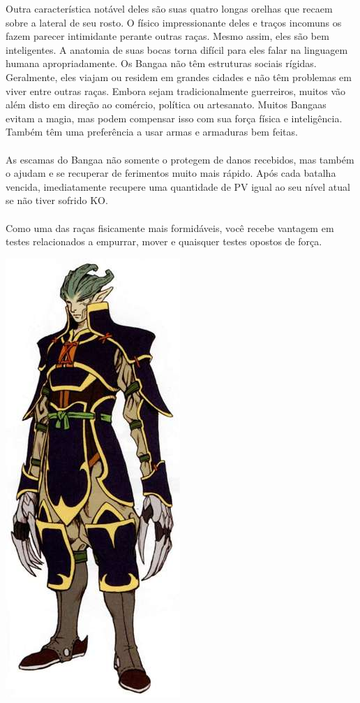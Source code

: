 Outra característica notável deles são suas quatro longas orelhas que recaem sobre a lateral de seu rosto.
O físico impressionante deles e traços incomuns os fazem parecer intimidante perante outras raças.
Mesmo assim, eles são bem inteligentes. A anatomia de suas bocas torna difícil para eles falar na linguagem humana apropriadamente.
Os Bangaa não têm estruturas sociais rígidas.
Geralmente, eles viajam ou residem em grandes cidades e não têm problemas em viver entre outras raças.
Embora sejam tradicionalmente guerreiros, muitos vão além disto em direção ao comércio, política ou artesanato.
Muitos Bangaas evitam a magia, mas podem compensar isso com sua força física e inteligência.
Também têm uma preferência a usar armas e armaduras bem feitas.
%
\\\\
%
 As escamas do Bangaa 
não somente o protegem de danos recebidos, mas também o ajudam e se recuperar de ferimentos muito mais rápido.
Após cada batalha vencida, imediatamente recupere uma quantidade de PV igual ao seu nível atual se não tiver sofrido KO.
%
\\\\
%
 Como uma das raças fisicamente mais formidáveis, você recebe vantagem em testes relacionados a empurrar, mover e quaisquer testes opostos de força.
%
%
\newpage
%
%
%
\begin{center} \includegraphics[width=0.5\columnwidth]{./art/races/guado.jpg} \end{center}
